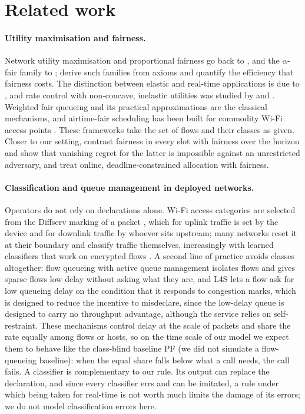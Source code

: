 \section{Related work}\label{sec:related}

\paragraph{Utility maximisation and fairness.}
Network utility maximisation and proportional fairness go back to \citet{kelly1998rate}, and the $\alpha$-fair family to \citet{mo2000fair}; \citet{lan2010axiomatic} derive such families from axioms and \citet{bertsimas2011price} quantify the efficiency that fairness costs.
The distinction between elastic and real-time applications is due to \citet{shenker1995fundamental}, and rate control with non-concave, inelastic utilities was studied by \citet{lee2005nonconvex} and \citet{hande2007distributed}.
Weighted fair queueing and its practical approximations \citep{parekh1993generalized,shreedhar1996efficient} are the classical mechanisms, and airtime-fair scheduling has been built for commodity Wi-Fi access points \citep{hoiland2017ending}.
These frameworks take the set of flows and their classes as given.
Closer to our setting, \citet{sisalem2023enabling} contrast fairness in every slot with fairness over the horizon and show that vanishing regret for the latter is impossible against an unrestricted adversary, and \citet{elazzouni2020deadline} treat online, deadline-constrained allocation with fairness.

\paragraph{Classification and queue management in deployed networks.}
Operators do not rely on declarations alone.
Wi-Fi access categories are selected from the Diffserv marking of a packet \citep{rfc8325}, which for uplink traffic is set by the device and for downlink traffic by whoever sits upstream; many networks reset it at their boundary and classify traffic themselves, increasingly with learned classifiers that work on encrypted flows \citep{rezaei2019deep}.
A second line of practice avoids classes altogether: flow queueing with active queue management \citep{rfc8290,hoiland2018cake} isolates flows and gives sparse flows low delay without asking what they are, and L4S \citep{rfc9330} lets a flow ask for low queueing delay on the condition that it responds to congestion marks, which is designed to reduce the incentive to misdeclare, since the low-delay queue is designed to carry no throughput advantage, although the service relies on self-restraint.
These mechanisms control delay at the scale of packets and share the rate equally among flows or hosts, so on the time scale of our model we expect them to behave like the class-blind baseline \textsc{PF} (we did not simulate a flow-queueing baseline): when the equal share falls below what a call needs, the call fails.
A classifier is complementary to our rule. Its output can replace the declaration, and since every classifier errs and can be imitated, a rule under which being taken for real-time is not worth much limits the damage of its errors; we do not model classification errors here.

